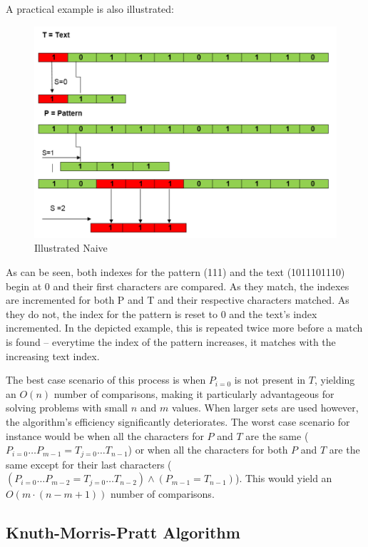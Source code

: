 \documentclass[12pt]{article}
\begin{document}
A practical example is also illustrated:

\begin{figure}[H]
	\includegraphics[scale=0.6]{naive_figure}
	\centering
	\caption{Illustrated Naive \parencite{11}}
\end{figure}

As can be seen, both indexes for the pattern (111) and the text (1011101110) begin at 0 and their first characters are compared. As they match, the indexes are incremented for both P and T and their respective characters matched. As they do not, the index for the pattern is reset to 0 and the text's index incremented. In the depicted example, this is repeated twice more before a match is found -- everytime the index of the pattern increases, it matches with the increasing text index.

The best case scenario of this process is when $P_{i=0}$ is not present in $T$, yielding an
$O(n)$ number of comparisons, making it particularly advantageous for solving problems
with small $n$ and $m$ values. When larger sets are used however, the algorithm's efficiency significantly deteriorates. The worst case scenario for instance would be when
all the characters for $P$ and $T$ are the same (${P_{i=0} \ldots P_{m-1}} = {T_{j=0} \ldots T_{n-1}}$) or
when all the characters for both $P$ and $T$ are the same except for their last characters ($({P_{i=0} \ldots P_{m-2}} = {T_{j=0} \ldots T_{n-2}}) \land (P_{m-1} = T_{n-1})$). This would yield an
$O(m \cdot (n - m + 1))$ number of comparisons.


\subsection{Knuth-Morris-Pratt Algorithm}
\end{document}
